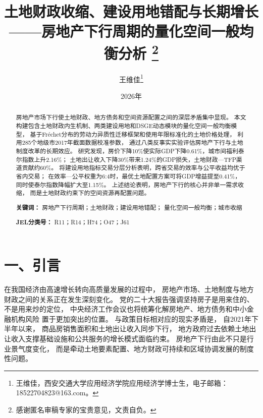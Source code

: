 \documentclass[UTF8,a4paper,12pt]{ctexart}
\theoremstyle{plain}
\theoremstyle{definition}
\theoremstyle{remark}
\begin{document}

\title{
  \vspace{-1cm}
  {\bfseries
  土地财政收缩、建设用地错配与长期增长}\\[6pt]
  {
  ——房地产下行周期的量化空间一般均衡分析}
  \thanks{感谢匿名审稿专家的宝贵意见，文责自负。}
}

\author{
  {王维佳\thanks{王维佳，西安交通大学应用经济学院应用经济学博士生，电子邮箱：18522704823@163.com。}}
}

\date{ 2026年}
\maketitle
\thispagestyle{empty}

\begin{abstract}
\noindent
房地产市场下行使土地财政、地方债务和空间资源配置之间的深层矛盾集中显现。
本文构建包含土地财政内生机制、两类建设用地和DSGE动态模块的量化空间一般均衡模型，
基于Fréchet分布的劳动力异质性迁移框架和使用年限标准化的土地价格处理，
利用285个地级市2017年截面数据校准参数，
通过八类反事实实验评估房地产下行与土地制度改革的长期效应。
研究发现，房价下降10\%使实际GDP下降0.61\%，城市间福利泰尔指数上升2.16\%；
土地出让收入下降30\%带来1.24\%的GDP损失，土地财政—TFP渠道贡献约60\%。
将建设用地指标交易分层分析表明，跨省交易的效率与公平收益均优于省内交易；
在效率—公平权重为6:4时，最优土地配置方案可将GDP增益提至0.41\%，
同时使泰尔指数降幅扩大至1.15\%。
上述结论表明，房地产下行的核心并非单一需求收缩，
而是土地财政约束下的空间资源再配置问题。

\medskip
\noindent\textbf{关键词：}
房地产下行周期；土地财政；建设用地错配；
量化空间一般均衡；城市收缩

\medskip
\noindent\textbf{JEL分类号：}
R11；R14；H74；O47；J61
\end{abstract}

\clearpage
{}
\setcounter{page}{1}

\setcounter{secnumdepth}{0}
\section{一、引言}

在我国经济由高速增长转向高质量发展的过程中，
房地产市场、土地制度与地方财政之间的关系正在发生深刻变化。
党的二十大报告强调坚持房子是用来住的、不是用来炒的定位，
中央经济工作会议也将统筹化解房地产、地方债务和中小金融机构风险
置于更加突出的位置。
与政策目标相对应的现实矛盾是，
自2021年下半年以来，
商品房销售面积和土地出让收入同步下行，
地方政府过去依赖土地出让收入支撑基础设施和公共服务的增长模式面临约束。
房地产下行由此不只是行业景气度变化，
而是牵动土地要素配置、地方财政可持续和区域协调发展的制度性问题。
\end{document}
